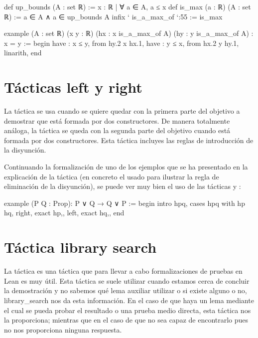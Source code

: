 \begin{leancode}
def up_bounds (A : set ℝ) := { x : ℝ | ∀ a ∈ A, a ≤ x}
def is_max (a : ℝ) (A : set ℝ) := a ∈ A ∧ a ∈ up_bounds A
infix ` is_a_max_of `:55 := is_max

example (A : set ℝ) (x y : ℝ) (hx : x is_a_max_of A) (hy : y is_a_max_of A) :
x = y :=
begin
  have : x ≤ y, from hy.2 x hx.1,
  have : y ≤ x, from hx.2 y hy.1,
  linarith,
end
\end{leancode}

\section{Tácticas left y right}

La táctica  se usa cuando se quiere quedar con la
primera parte del objetivo a demostrar que está formada por dos constructores.
De manera totalmente análoga, la táctica  se queda
con la segunda parte del objetivo cuando está formada por dos
constructores. Esta táctica incluyes las reglas de introducción de la
disyunción.

Continuando la formalización de uno de los ejemplos que se ha presentado en la
explicación de la táctica  (en concreto el usado para
ilustrar la regla de eliminación de la disyunción), se puede ver muy bien el
uso de las tácticas  y :
\begin{leancode}
example (P Q : Prop): P ∨ Q → Q ∨ P :=
begin
  intro hpq,
  cases hpq with hp hq,
  { right,
    exact hp,},
  { left,
    exact hq,},
end
\end{leancode}

\section{Táctica library search}

La táctica  es una táctica que
para llevar a cabo formalizaciones de pruebas en Lean es muy útil. Esta
táctica se suele utilizar cuando estamos cerca de concluir la
demostración y no sabemos qué lema auxiliar utilizar o si existe alguno
o no,  {library\_search} nos da esta
información. En el caso de que haya un lema mediante el cual se pueda
probar el resultado o una prueba medio directa, esta táctica nos la
proporciona; mientras que en el caso de que no sea capaz de encontrarlo
pues no nos proporciona ninguna respuesta.

